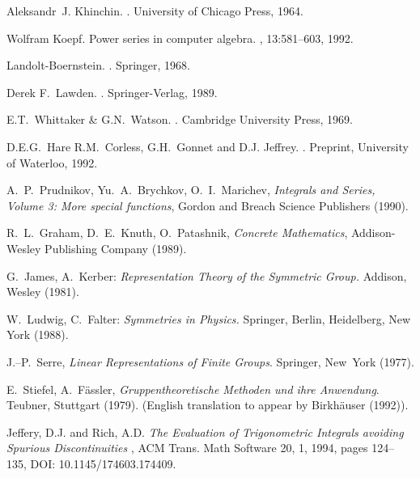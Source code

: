 \begin{thebibliography}{999}

Aleksandr~J. Khinchin.
.
\newblock University of Chicago Press, 1964.

Wolfram Koepf.
\newblock Power series in computer algebra.
, 13:581--603, 1992.

Landolt-Boernstein.
.
\newblock Springer, 1968.

Derek F.~Lawden.
.
\newblock Springer-Verlag, 1989.

E.T.~Whittaker \& G.N.~Watson.
.
\newblock Cambridge University Press, 1969.

D.E.G.~Hare R.M.~Corless, G.H.~Gonnet and D.J. Jeffrey.
.
\newblock Preprint, University of Waterloo, 1992.


 A.~P.~Prudnikov, Yu.~A.~Brychkov, O.~I.~Marichev,
{\em Integrals and Series, Volume 3: More special functions},
Gordon and Breach Science Publishers (1990).

 R.~L.~Graham, D.~E.~Knuth, O.~Patashnik,
{\em Concrete Mathematics}, Addison-Wesley Publishing Company (1989).


 G.\ James, A.\ Kerber: {\it Representation Theory
of the Symmetric Group.} Addison, Wesley (1981).

 W.\ Ludwig, C.\ Falter: {\it Symmetries in Physics.}
Springer, Berlin, Heidelberg, New York (1988).

 J.--P.\ Serre, {\it Linear Representations of Finite
Groups}. Springer, New~York (1977).

 E.\  Stiefel, A.\  F{\"a}ssler, {\it Gruppentheoretische
Methoden und ihre Anwendung}. Teubner, Stuttgart (1979).
(English translation to appear by Birkh\"auser (1992)).


 Jeffery, D.J. and Rich, A.D.
\textit{The Evaluation of Trigonometric Integrals avoiding Spurious Discontinuities
}, ACM Trans. Math Software 20, 1, 1994, pages 124--135, DOI: 10.1145/174603.174409.



\end{thebibliography}
